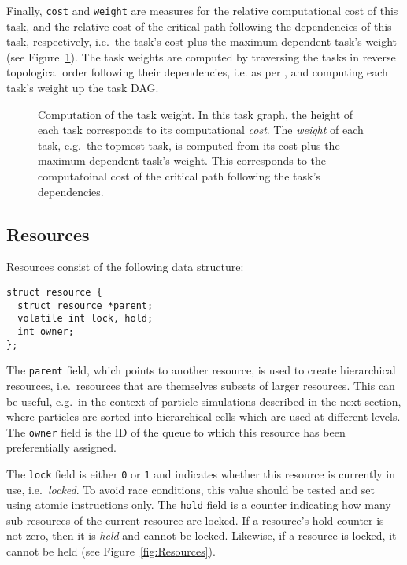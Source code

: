 \documentclass[preprint]{elsarticle}
\newcommand{\fig}[1]
    {Figure~\ref{fig:#1}}
\begin{document}
Finally, {\tt cost} and {\tt weight} are measures
for the relative computational cost of this task, and the
relative cost of the critical path following the
dependencies of this task, respectively, i.e.~the task's cost
plus the maximum dependent task's weight (see \fig{TaskWeight}).
The task weights are computed by traversing
the tasks in reverse topological order following their dependencies, i.e.
as per \cite{ref:Kahn1962}, and computing each task's weight
up the task DAG.

\begin{figure}
    \centerline{}
    \caption{Computation of the task weight.
      In this task graph, the height of each task corresponds to its
      computational {\em cost}.
      The {\em weight} of each task, e.g.~the topmost task,
      is computed from its cost plus
      the maximum dependent task's weight.
      This corresponds to the computatoinal cost of the critical
      path following the task's dependencies.}
    \label{fig:TaskWeight}
\end{figure}


\subsection{Resources}

Resources consist of the following data structure:
\begin{center}\begin{minipage}{0.9\textwidth}
    \begin{lstlisting}
struct resource {
  struct resource *parent;
  volatile int lock, hold;
  int owner;
};
    \end{lstlisting}
\end{minipage}\end{center}

The {\tt parent} field, which points to another resource, is
used to create hierarchical resources, i.e.~resources
that are themselves subsets of larger resources.
This can be useful, e.g.~in the context of particle simulations
described in the next section, where particles are sorted
into hierarchical cells which are used at different levels.
The {\tt owner} field is the ID of the queue to which this
resource has been preferentially assigned.

The {\tt lock} field is either {\tt 0} or {\tt 1} and indicates
whether this resource is currently in use, i.e.~{\em locked}.
To avoid race conditions, this value should be tested
and set using atomic instructions only.
The {\tt hold} field is a counter indicating how many
sub-resources of the current resource are locked.
If a resource's hold counter is not zero, then it is
{\em held} and cannot be locked.
Likewise, if a resource is locked, it cannot be held
(see \fig{Resources}).
\end{document}

